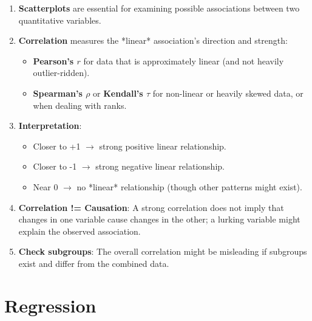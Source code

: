 \documentclass[10pt]{extarticle}
\begin{document}
\begin{takeaway-box}{}{}
\begin{enumerate}
    \item \textbf{Scatterplots} are essential for examining possible associations between two quantitative variables.
    \item \textbf{Correlation} measures the *linear* association's direction and strength:
          \begin{itemize}
              \item \textbf{Pearson's $r$} for data that is approximately linear (and not heavily outlier-ridden).
              \item \textbf{Spearman's $\rho$} or \textbf{Kendall's $\tau$} for non-linear or heavily skewed data, or when dealing with ranks.
          \end{itemize}
    \item \textbf{Interpretation}:
          \begin{itemize}
              \item Closer to +1 $\rightarrow$ strong positive linear relationship.
              \item Closer to -1 $\rightarrow$ strong negative linear relationship.
              \item Near 0 $\rightarrow$ no *linear* relationship (though other patterns might exist).
          \end{itemize}
    \item \textbf{Correlation != Causation}: A strong correlation does not imply that changes in one variable cause changes in the other; a lurking variable might explain the observed association.
    \item \textbf{Check subgroups}: The overall correlation might be misleading if subgroups exist and differ from the combined data.
\end{enumerate}
\end{takeaway-box}

\section{Regression}
\end{document}
